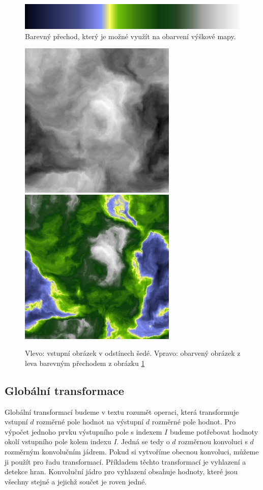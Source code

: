 \begin{figure}[h]
\centering
\includegraphics[width=15cm,keepaspectratio]{obr/gradient.png}
\caption{Barevný přechod, který je možné využít na obarvení výškové mapy.}
\label{fig:prechod}
\end{figure}

\begin{figure}[h]
\centering
\includegraphics[width=7.5cm,keepaspectratio]{obr/gradmap0.jpg}
\includegraphics[width=7.5cm,keepaspectratio]{obr/gradmap1.jpg}
\caption{Vlevo: vstupní obrázek v odstínech šedé. Vpravo: obarvený obrázek z leva barevným přechodem z obrázku \ref{fig:prechod}}
\label{fig:gradmap}
\end{figure}

\subsection{Globální transformace}
Globální transformací budeme v textu rozumět operaci, která transformuje vstupní $d$ roz\-měr\-né pole hodnot na výstupní $d$ rozměrné pole hodnot.
Pro výpočet jednoho prvku výstupního pole s indexem $I$ budeme potřebovat hodnoty okolí vstupního pole kolem indexu $I$.
Jedná se tedy o $d$ rozměrnou konvoluci s $d$ rozměrným konvolučním jádrem.
Pokud si vytvoříme obecnou konvoluci, můžeme ji použít pro řadu transformací.
Příkladem těchto transformací je vyhlazení a detekce hran.
Konvoluční jádro pro vyhlazení obsahuje hodnoty, které jsou všechny stejné a jejichž součet je roven jedné.

